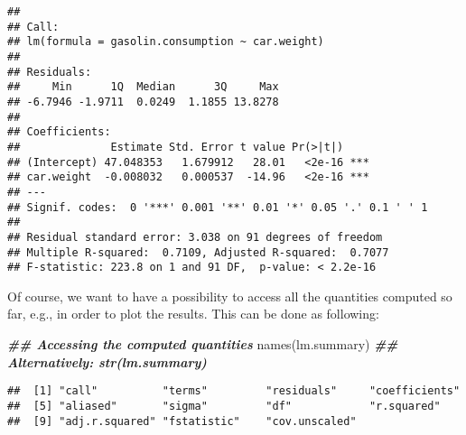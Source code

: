\documentclass[
]{book}
\newenvironment{Shaded}{\begin{snugshade}}{\end{snugshade}}
\newcommand{\AttributeTok}[1]{\textcolor[rgb]{0.77,0.63,0.00}{#1}}
\newcommand{\DecValTok}[1]{\textcolor[rgb]{0.00,0.00,0.81}{#1}}
\newcommand{\DocumentationTok}[1]{\textcolor[rgb]{0.56,0.35,0.01}{\textbf{\textit{#1}}}}
\newcommand{\FunctionTok}[1]{\textcolor[rgb]{0.00,0.00,0.00}{#1}}
\newcommand{\NormalTok}[1]{#1}
\newcommand{\OtherTok}[1]{\textcolor[rgb]{0.56,0.35,0.01}{#1}}
\newcommand{\SpecialCharTok}[1]{\textcolor[rgb]{0.00,0.00,0.00}{#1}}
\newcommand{\StringTok}[1]{\textcolor[rgb]{0.31,0.60,0.02}{#1}}
\begin{document}
\begin{verbatim}
## 
## Call:
## lm(formula = gasolin.consumption ~ car.weight)
## 
## Residuals:
##     Min      1Q  Median      3Q     Max 
## -6.7946 -1.9711  0.0249  1.1855 13.8278 
## 
## Coefficients:
##              Estimate Std. Error t value Pr(>|t|)    
## (Intercept) 47.048353   1.679912   28.01   <2e-16 ***
## car.weight  -0.008032   0.000537  -14.96   <2e-16 ***
## ---
## Signif. codes:  0 '***' 0.001 '**' 0.01 '*' 0.05 '.' 0.1 ' ' 1
## 
## Residual standard error: 3.038 on 91 degrees of freedom
## Multiple R-squared:  0.7109, Adjusted R-squared:  0.7077 
## F-statistic: 223.8 on 1 and 91 DF,  p-value: < 2.2e-16
\end{verbatim}

\hfill\break

Of course, we want to have a possibility to access all the quantities computed so far, e.g., in order to plot the results. This can be done as following:

\begin{Shaded}
\begin{Highlighting}[]
\DocumentationTok{\#\# Accessing the computed quantities}
\FunctionTok{names}\NormalTok{(lm.summary) }\DocumentationTok{\#\# Alternatively: str(lm.summary)}
\end{Highlighting}
\end{Shaded}

\begin{verbatim}
##  [1] "call"          "terms"         "residuals"     "coefficients" 
##  [5] "aliased"       "sigma"         "df"            "r.squared"    
##  [9] "adj.r.squared" "fstatistic"    "cov.unscaled"
\end{verbatim}

\begin{Shaded}
\end{Shaded}
\end{document}
